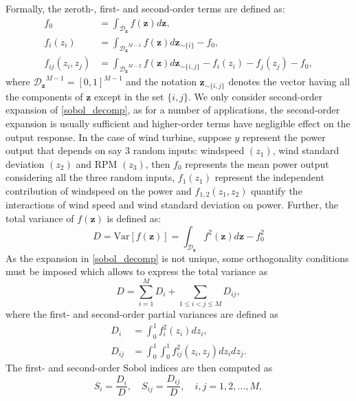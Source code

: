 \documentclass[review]{elsarticle}
\numberwithin{equation}{section}
\numberwithin{equation}{section}
\begin{document}
Formally, the zeroth-, first- and second-order terms are defined as:
\begin{align}\label{sobol_terms}
f_0 &= \int_{\mathcal{D}_{\mathbf{z}}}f(\mathbf{z})d\mathbf{z},\\
f_i(z_i) &= \int_{{\mathcal{D}_{\mathbf{z}}}^{M-1}}f(\mathbf{z})d\mathbf{z}_{\sim \{i\}} - f_0,\\
f_{ij}(z_i,z_j) &= \int_{{\mathcal{D}_{\mathbf{z}}}^{M-2}}f(\mathbf{z})d\mathbf{z}_{\sim \{i,j\}} - f_i(z_i) - f_j(z_j) - f_0,
\end{align}
where ${\mathcal{D}_{\mathbf{z}}}^{M-1} = [0,1]^{M-1}$ and the notation $\mathbf{z}_{\sim \{i,j\}}$ denotes the vector having all the components of $\mathbf{z}$ except in the set $\{i,j\}$. We only consider second-order expansion of \eqref{sobol_decomp}, as for a number of applications, the second-order expansion is usually sufficient and higher-order terms have negligible effect on the output response. In the case of wind turbine, suppose $y$ represent the power output that depends on say 3 random inputs: windspeed $(z_1)$, wind standard deviation $(z_2)$ and RPM $(z_3)$, then $f_0$ represents the mean power output considering all the three random inputs, $f_1(z_1)$ represent the independent contribution of windspeed on the power and $f_{1,2}(z_1,z_2)$ quantify the interactions of wind speed and wind standard deviation on power. Further, the total variance of $f(\mathbf{z})$ is defined as:
\begin{equation}\label{tot_var}
D = \text{Var}[f(\mathbf{z})] = \int_{\mathcal{D}_{\mathbf{z}}} f^2(\mathbf{z})d\mathbf{z} - f_0^2
\end{equation}
As the expansion in \eqref{sobol_decomp} is not unique, some orthogonality conditions must be imposed  \cite{Rabitz1999,SOBOL2001271} which allows to express the total variance as
\begin{equation}
D = \sum_{i=1}^M D_i + \sum_{1\leq i<j\leq M} D_{ij},
\end{equation}
where the first- and second-order partial variances are defined as
\begin{align}
D_i &= \int_{0}^{1} f^2_i(z_i)dz_i, \label{partial_variance1}\\
D_{ij} &= \int_{0}^{1} \int_{0}^{1} f^2_{ij}(z_i,z_j)dz_idz_j \label{partial_variance2}. 
\end{align}
The first- and second-order Sobol indices are then computed as
\begin{equation}\label{sobol_ind}
S_i = \frac{D_i}{D}, \quad S_{ij} = \frac{D_{ij}}{D}, \quad i,j=1,2, ..., M,
\end{equation}
\end{document}
